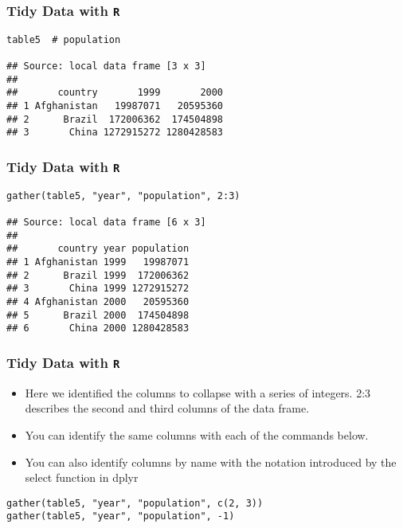 \documentclass[TIDYMASTER.tex]{subfiles}
\begin{document}
\begin{frame}[fragile]
\frametitle{Tidy Data with \texttt{R}}
\Large
\begin{verbatim}
table5  # population

## Source: local data frame [3 x 3]
## 
##       country       1999       2000
## 1 Afghanistan   19987071   20595360
## 2      Brazil  172006362  174504898
## 3       China 1272915272 1280428583
\end{verbatim}
\end{frame}
\begin{frame}[fragile]
	\frametitle{Tidy Data with \texttt{R}}
	\Large
	\begin{verbatim}
gather(table5, "year", "population", 2:3)

## Source: local data frame [6 x 3]
## 
##       country year population
## 1 Afghanistan 1999   19987071
## 2      Brazil 1999  172006362
## 3       China 1999 1272915272
## 4 Afghanistan 2000   20595360
## 5      Brazil 2000  174504898
## 6       China 2000 1280428583
\end{verbatim}
\end{frame}
\begin{frame}[fragile]
\frametitle{Tidy Data with \texttt{R}}
\Large
\begin{itemize}
\item Here we identified the columns to collapse with a series of integers. 2:3 describes the second and third columns of the data frame. 
\item You can identify the same columns with each of the commands below.

\item You can also identify columns by name with the notation introduced by the select function in dplyr
\end{itemize}

\begin{framed}
\begin{verbatim}
gather(table5, "year", "population", c(2, 3))
gather(table5, "year", "population", -1)
\end{verbatim}
\end{framed}
\end{frame}
%
%
\end{document}

